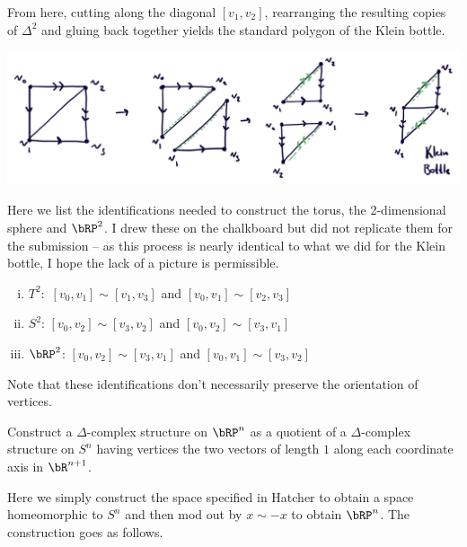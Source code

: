 \begin{homework}[e]
\begin{prf}
\begin{center}
      \label{fig:prob2-1}
    \end{center}
    From here, cutting along the diagonal $[v_1,v_2]$, rearranging the resulting copies of $\Delta^2$ and gluing back together yields the standard polygon of the Klein bottle. 
    \begin{center}
      \includegraphics[width=14cm]{figures/hwk7-fig2.png}
      \label{fig:prob2-2}
    \end{center}

    Here we list the identifications needed to construct the torus, the 2-dimensional sphere and $\bRP^2$. I drew these on the chalkboard but did not replicate them for the submission -- as this process is nearly identical to what we did for the Klein bottle, I hope the lack of a picture is permissible.
    \begin{enumerate}[(i)]
      \item $T^2:$ $[v_0,v_1] \sim [v_1,v_3]$ and $[v_0,v_1]\sim [v_2,v_3]$
      \item $S^2$: $[v_0,v_2]\sim [v_3,v_2]$ and $[v_0,v_2]\sim [v_3,v_1]$
      \item $\bRP^2$: $[v_0,v_2]\sim [v_3,v_1]$ and $[v_0,v_1]\sim [v_3,v_2]$
    \end{enumerate}
    Note that these identifications don't necessarily preserve the orientation of vertices.
  \end{prf}

  \prob[2.1.3] Construct a $\Delta$-complex structure on $\bRP^n$ as a quotient of a $\Delta$-complex structure on $S^n$ having vertices the two vectors of length $1$ along each coordinate axis in $\bR^{n+1}$.
  \begin{prf}
    Here we simply construct the space specified in Hatcher to obtain a space homeomorphic to $S^n$ and then mod out by $x \sim -x$ to obtain $\bRP^n$. The construction goes as follows.
    

\end{prf}
\end{homework}

